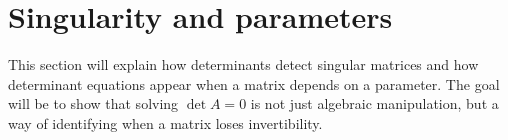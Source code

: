 \section{Singularity and parameters}

This section will explain how determinants detect singular matrices and how determinant equations appear when a matrix depends on a parameter. The goal will be to show that solving \(\det A=0\) is not just algebraic manipulation, but a way of identifying when a matrix loses invertibility.
